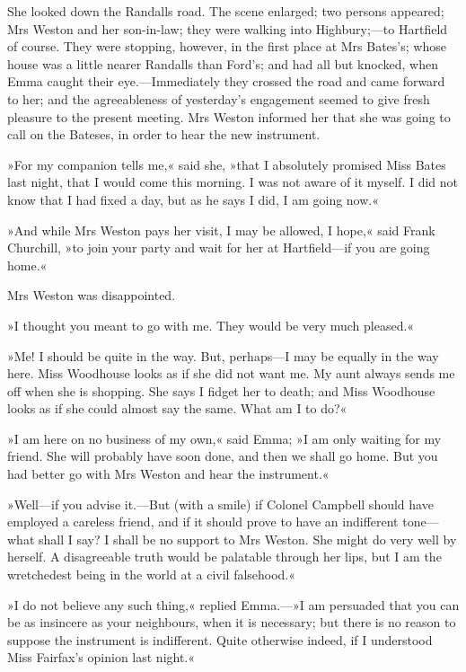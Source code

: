 She looked down the Randalls road. The scene enlarged; two persons appeared; Mrs Weston and her son-in-law; they were walking into Highbury;—to Hartfield of course. They were stopping, however, in the first place at Mrs Bates's; whose house was a little nearer Randalls than Ford's; and had all but knocked, when Emma caught their eye.—Immediately they crossed the road and came forward to her; and the agreeableness of yesterday's engagement seemed to give fresh pleasure to the present meeting. Mrs Weston informed her that she was going to call on the Bateses, in order to hear the new instrument.

»For my companion tells me,« said she, »that I absolutely promised Miss Bates last night, that I would come this morning. I was not aware of it myself. I did not know that I had fixed a day, but as he says I did, I am going now.«

»And while Mrs Weston pays her visit, I may be allowed, I hope,« said Frank Churchill, »to join your party and wait for her at Hartfield—if you are going home.«

Mrs Weston was disappointed.

»I thought you meant to go with me. They would be very much pleased.«

»Me! I should be quite in the way. But, perhaps—I may be equally in the way here. Miss Woodhouse looks as if she did not want me. My aunt always sends me off when she is shopping. She says I fidget her to death; and Miss Woodhouse looks as if she could almost say the same. What am I to do?«

»I am here on no business of my own,« said Emma; »I am only waiting for my friend. She will probably have soon done, and then we shall go home. But you had better go with Mrs Weston and hear the instrument.«

»Well—if you advise it.—But (with a smile) if Colonel Campbell should have employed a careless friend, and if it should prove to have an indifferent tone—what shall I say? I shall be no support to Mrs Weston. She might do very well by herself. A disagreeable truth would be palatable through her lips, but I am the wretchedest being in the world at a civil falsehood.«

»I do not believe any such thing,« replied Emma.—»I am persuaded that you can be as insincere as your neighbours, when it is necessary; but there is no reason to suppose the instrument is indifferent. Quite otherwise indeed, if I understood Miss Fairfax's opinion last night.«

